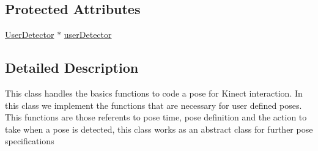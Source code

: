 \subsection*{Protected Attributes}
\begin{DoxyCompactItemize}
\item 
\hyperlink{classUserDetector}{UserDetector} $\ast$ \hyperlink{classAbstractPoseDetection_a20dccd0d1494d1ef0ec896e996b5e70b}{userDetector}
\end{DoxyCompactItemize}


\subsection{Detailed Description}
This class handles the basics functions to code a pose for Kinect interaction. In this class we implement the functions that are necessary for user defined poses. This functions are those referents to pose time, pose definition and the action to take when a pose is detected, this class works as an abstract class for further pose specifications 

